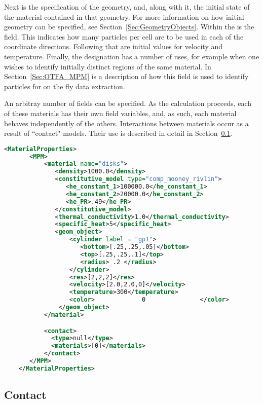 Next is the specification of the geometry, and, along with it, the initial
state of the material contained in that geometry.  For more information on
how initial geometry can be specified, see Section~\ref{Sec:GeometryObjects}.  Within the
 is the  field.  This
indicates how many particles per cell are to be used in each of the 
coordinate directions.  Following that are initial values for velocity and
temperature.  Finally, the  designation has a number
of uses, for example when one wishes to identify initially distinct regions
of the same material.  In Section~\ref{Sec:OTFA_MPM} is a description of how
this field is used to identify particles for on the fly data extraction.

An arbitray number of  fields can be specified.
As the calculation proceeds, each of these materials has their own field
variables, and, as such, each material behaves independently of the others.
Interactions between materials occur as a result of ``contact" models.
Their use is described in detail in Section~\ref{Sec:Contact}.

\begin{lstlisting}[language=XML]
    <MaterialProperties>
       <MPM>
           <material name="disks">
              <density>1000.0</density>
              <constitutive_model type="comp_mooney_rivlin">
                 <he_constant_1>100000.0</he_constant_1>
                 <he_constant_2>20000.0</he_constant_2>
                 <he_PR>.49</he_PR>
              </constitutive_model>
              <thermal_conductivity>1.0</thermal_conductivity>
              <specific_heat>5</specific_heat>
              <geom_object>
                  <cylinder label = "gp1">
                     <bottom>[.25,.25,.05]</bottom>
                     <top>[.25,.25,.1]</top>
                     <radius> .2 </radius>
                  </cylinder>
                  <res>[2,2,2]</res>
                  <velocity>[2.0,2.0,0]</velocity>
                  <temperature>300</temperature>
                  <color>             0               </color>
               </geom_object>
           </material>

           <contact>
             <type>null</type>
             <materials>[0]</materials>
           </contact>
       </MPM>
    </MaterialProperties>
\end{lstlisting}

\subsection{Contact}  \label{Sec:Contact}


